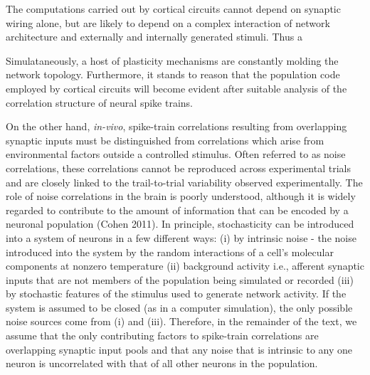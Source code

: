 \documentclass{ucetd}
\begin{document}
The computations carried out by cortical circuits cannot depend on synaptic wiring alone, but are likely to depend on a complex interaction of network architecture and externally and internally generated stimuli. Thus a 

Simulataneously, a host of plasticity mechanisms are constantly molding the network topology. Furthermore, it stands to reason that the population code employed by cortical circuits will become evident after suitable analysis of the correlation structure of neural spike trains.

On the other hand, \emph{in-vivo}, spike-train correlations resulting from overlapping synaptic inputs must be distinguished from  correlations which arise from environmental factors outside a controlled stimulus. Often referred to as noise correlations, these correlations cannot be reproduced across experimental trials and are closely linked to the trail-to-trial variability observed experimentally. The role of noise correlations in the brain is poorly understood, although it is widely regarded to contribute to the amount of information that can be encoded by a neuronal population (Cohen 2011). In principle, stochasticity can be introduced into a system of neurons in a few different ways: (i) by intrinsic noise - the noise introduced into the system by the random interactions of a cell's molecular components at nonzero temperature (ii) background activity i.e., afferent synaptic inputs that are not members of the population being simulated or recorded (iii) by stochastic features of the stimulus used to generate network activity. If the system is assumed to be closed (as in a computer simulation), the only possible noise sources come from (i) and (iii). Therefore, in the remainder of the text, we assume that the only contributing factors to spike-train correlations are overlapping synaptic input pools and that any noise that is intrinsic to any one neuron is uncorrelated with that of all other neurons in the population.
\end{document}
